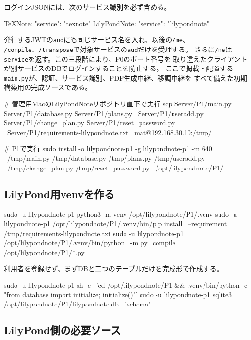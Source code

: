 \documentclass[uplatex,a4paper,11pt]{jsarticle}
\begin{document}
ログインJSONには、次のサービス識別を必ず含める。

\begin{command}
TeXNote:       "service": "texnote"
LilyPondNote:  "service": "lilypondnote"
\end{command}

発行するJWTの\texttt{aud}にも同じサービス名を入れ、以後の\texttt{/me}、
\texttt{/compile}、\texttt{/transpose}で対象サービスの\texttt{aud}だけを受理する。
さらに\texttt{/me}は\texttt{service}を返す。この三段階により、P0のポート番号を
取り違えたクライアントが別サービスのDBでログインすることを防止する。
ここで掲載・配置する\texttt{main.py}が、認証、サービス識別、PDF生成中継、移調中継を
すべて備えた初期構築用の完成ソースである。

\begin{command}
# 管理用MacのLilyPondNoteリポジトリ直下で実行
scp Server/P1/main.py Server/P1/database.py Server/P1/plans.py \
  Server/P1/useradd.py Server/P1/change_plan.py Server/P1/reset_password.py \
  Server/P1/requirements-lilypondnote.txt \
  mat@192.168.30.10:/tmp/

# P1で実行
sudo install -o lilypondnote-p1 -g lilypondnote-p1 -m 640 \
  /tmp/main.py /tmp/database.py /tmp/plans.py /tmp/useradd.py \
  /tmp/change_plan.py /tmp/reset_password.py \
  /opt/lilypondnote/P1/
\end{command}

\subsection{LilyPond用venvを作る}

\begin{command}
sudo -u lilypondnote-p1 python3 -m venv /opt/lilypondnote/P1/.venv
sudo -u lilypondnote-p1 /opt/lilypondnote/P1/.venv/bin/pip install \
  --requirement /tmp/requirements-lilypondnote.txt
sudo -u lilypondnote-p1 /opt/lilypondnote/P1/.venv/bin/python \
  -m py_compile /opt/lilypondnote/P1/*.py
\end{command}

利用者を登録せず、まずDBと二つのテーブルだけを完成形で作成する。

\begin{command}
sudo -u lilypondnote-p1 sh -c \
  'cd /opt/lilypondnote/P1 && .venv/bin/python -c "from database import initialize; initialize()"'
sudo -u lilypondnote-p1 sqlite3 /opt/lilypondnote/P1/lilypondnote.db \
  '.schema'
\end{command}

\subsection{LilyPond側の必要ソース}
\end{document}

